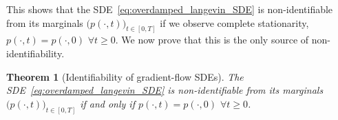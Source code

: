 \documentclass[twoside]{article}
\newtheorem{theorem}{Theorem}[section]
\begin{document}

This shows that the SDE~\eqref{eq:overdamped_langevin_SDE} is non-identifiable from its marginals $\bigl(p(\cdot, t)\bigr)_{t \in [0,T]}$ if we observe complete stationarity, $p(\cdot, t) = p(\cdot, 0)$ $\forall t \ge 0$. We now prove that this is the only source of non-identifiability.


\begin{theorem}[Identifiability of gradient-flow SDEs]
\label{thm:identifiability} 
The SDE~\eqref{eq:overdamped_langevin_SDE} is non-identifiable from its marginals $\bigl(p(\cdot, t)\bigr)_{t \in [0,T]}$ if and only if $p(\cdot, t)=p(\cdot, 0)$ $\forall t \ge 0$.
\end{theorem}
\end{document}
